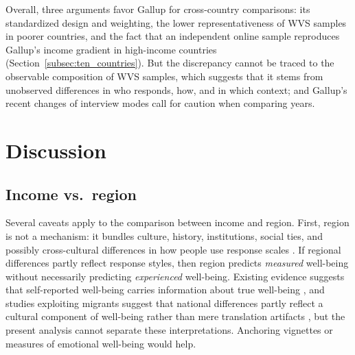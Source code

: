 \documentclass[12pt]{article}
\begin{document}
Overall, three arguments favor Gallup for cross-country comparisons: its standardized design and weighting, the lower representativeness of WVS samples in poorer countries, and the fact that an independent online sample reproduces Gallup's income gradient in high-income countries (Section~\ref{subsec:ten_countries}). But the discrepancy cannot be traced to the observable composition of WVS samples, which suggests that it stems from unobserved differences in who responds, how, and in which context; and Gallup's recent changes of interview modes call for caution when comparing years. %

\section{Discussion}\label{sec:discussion}
\subsection{Income vs.\ region}
Several caveats apply to the comparison between income and region. First, region is not a mechanism: it bundles culture, history, institutions, social ties, and possibly cross-cultural differences in how people use response scales \citep{chen_response_1995,diener_personality_2003,exton_comparing_2015}. If regional differences partly reflect response styles, then region predicts \textit{measured} well-being without necessarily predicting \textit{experienced} well-being. Existing evidence suggests that self-reported well-being carries information about true well-being \citep{sandvik_subjective_1993,kaiser_scientific_2022}, and studies exploiting migrants suggest that national differences partly reflect a cultural component %
of well-being rather than mere translation artifacts \citep{senik_french_2014,exton_comparing_2015}, but the present analysis cannot separate these interpretations. Anchoring vignettes \citep{kapteyn_life_2010} or measures of emotional well-being would help.
\end{document}
